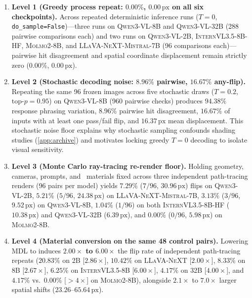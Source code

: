 \begin{enumerate}
    \item \textbf{Level 1 (Greedy process repeat: $0.00\%$, $0.00\,\mathrm{px}$ on all six checkpoints).} Across repeated deterministic inference runs ($T{=}0$, \texttt{do\_sample=False})---three runs on \textsc{Qwen3-VL-8B} and \textsc{Qwen3-VL-32B} (288 pairwise comparisons each) and two runs on \textsc{Qwen3-VL-2B}, \textsc{InternVL3.5-8B-HF}, \textsc{Molmo2-8B}, and \textsc{LLaVA-NeXT-Mistral-7B} (96 comparisons each)---pairwise hit disagreement and spatial coordinate displacement remain strictly zero ($0.00\%$, $0.00\,\mathrm{px}$).
    \item \textbf{Level 2 (Stochastic decoding noise: $8.96\%$ pairwise, $16.67\%$ any-flip).} Repeating the same 96 frozen images across five stochastic draws ($T{=}0.2$, $\text{top-}p{=}0.95$) on \textsc{Qwen3-VL-8B} (960 pairwise checks) produces $94.38\%$ response phrasing variation, $8.96\%$ pairwise hit disagreement, $16.67\%$ of inputs with at least one pass/fail flip, and $16.37\,\mathrm{px}$ mean displacement. This stochastic noise floor explains why stochastic sampling confounds shading studies (\ref{app:archive}) and motivates locking greedy $T{=}0$ decoding to isolate visual sensitivity.
    \item \textbf{Level 3 (Monte Carlo ray-tracing re-render floor).} Holding geometry, cameras, prompts, and \original\ materials fixed across three independent path-tracing renders (96 pairs per model) yields $7.29\%$ ($7/96$, $30.96\,\mathrm{px}$) flips on \textsc{Qwen3-VL-2B}, $5.21\%$ ($5/96$, $24.38\,\mathrm{px}$) on \textsc{LLaVA-NeXT-Mistral-7B}, $3.13\%$ ($3/96$, $9.52\,\mathrm{px}$) on \textsc{Qwen3-VL-8B}, $1.04\%$ ($1/96$) on both \textsc{InternVL3.5-8B-HF} ($10.38\,\mathrm{px}$) and \textsc{Qwen3-VL-32B} ($6.39\,\mathrm{px}$), and $0.00\%$ ($0/96$, $5.98\,\mathrm{px}$) on \textsc{Molmo2-8B}.
    \item \textbf{Level 4 (Material conversion on the same 48 control pairs).} Lowering \textsc{MDL} to \usdps{} induces \textbf{$2.00\times$ to $6.00\times$} the flip rate of independent path-tracing repeats ($20.83\%$ on 2B [$2.86\times$], $10.42\%$ on \textsc{LLaVA-NeXT} [$2.00\times$], $8.33\%$ on 8B [$2.67\times$], $6.25\%$ on \textsc{InternVL3.5-8B} [$6.00\times$], $4.17\%$ on \textsc{32B} [$4.00\times$], and $4.17\%$ vs.\ $0.00\%$ [$>4\times$] on \textsc{Molmo2-8B}), alongside $2.1\times$ to $7.0\times$ larger spatial shifts ($23.26\text{--}65.64\,\mathrm{px}$).
\end{enumerate}

